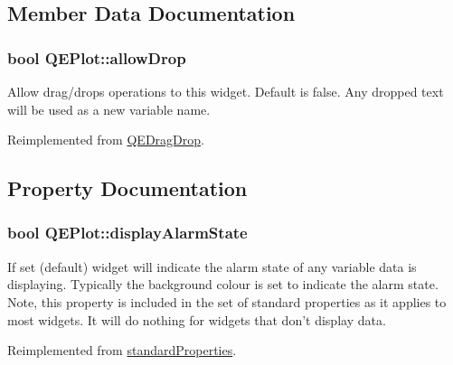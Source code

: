 \subsection{Member Data Documentation}
\hypertarget{classQEPlot_aa68e5b9bb3c26d62b65e524970d67159}{
\subsubsection[{allowDrop}]{\setlength{\rightskip}{0pt plus 5cm}bool {\bf QEPlot::allowDrop}}}
\label{classQEPlot_aa68e5b9bb3c26d62b65e524970d67159}
Allow drag/drops operations to this widget. Default is false. Any dropped text will be used as a new variable name. 

Reimplemented from \hyperlink{classQEDragDrop}{QEDragDrop}.



\subsection{Property Documentation}
\hypertarget{classQEPlot_a36de8c7bec3e3ef4486f4b98694fbdd8}{
\subsubsection[{displayAlarmState}]{\setlength{\rightskip}{0pt plus 5cm}bool QEPlot::displayAlarmState}}
\label{classQEPlot_a36de8c7bec3e3ef4486f4b98694fbdd8}
If set (default) widget will indicate the alarm state of any variable data is displaying. Typically the background colour is set to indicate the alarm state. Note, this property is included in the set of standard properties as it applies to most widgets. It will do nothing for widgets that don't display data. 

Reimplemented from \hyperlink{classstandardProperties}{standardProperties}.

